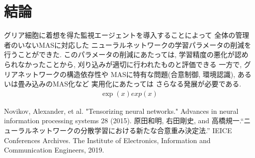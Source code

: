 \documentclass[a4paper,10.5pt,twocolumn]{jsarticle}
\begin{document}
\section{結論}
グリア細胞に着想を得た監視エージェントを導入することによって
全体の管理者のいないMASに対応した
ニューラルネットワークの学習パラメータの削減を行うことができた.
このパラメータの削減にあたっては, 学習精度の悪化が認められなかったことから, 
刈り込みが適切に行われたものと評価できる
一方で, グリアネットワークの構造依存性や
MASに特有な問題(合意制御, 環境認識), あるいは畳み込みのMAS化など
実用化にあたっては
さらなる発展が必要である.
\begin{align}
  \exp(x) exp(x)
\end{align}
 \begin{thebibliography}{99}
  Novikov, Alexander, et al. "Tensorizing neural networks." Advances in neural information processing systems 28 (2015).
  原田和明, 右田剛史, and 高橋規一.``ニューラルネットワークの分散学習における新たな合意重み決定法.'' IEICE Conferences Archives. The Institute of Electronics, Information and Communication Engineers, 2019.
\end{thebibliography}
 
\end{document}
